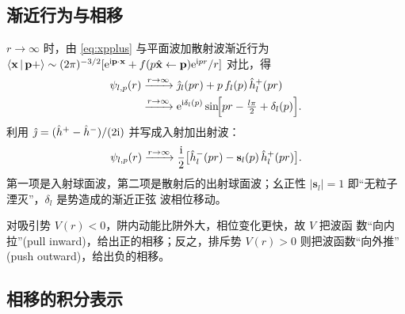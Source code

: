 \subsection{渐近行为与相移}

$r\to\infty$ 时，由 \eqref{eq:xpplus} 与平面波加散射波渐近行为
$\left\langle \mathbf x \,\middle|\, \mathbf p+ \right\rangle\sim
(2\pi)^{-3/2}[\mathrm{e}^{\mathrm{i}\mathbf p\cdot\mathbf x}+f(p\hat{\mathbf x}\leftarrow\mathbf p)\mathrm{e}^{\mathrm{i} pr}/r]$
对比，得
\begin{align}
\psi_{l,p}(r)
&\xrightarrow{r\to\infty} \hat\jmath_l(pr)
   + p\,f_l(p)\,\hat h_l^+(pr)\nonumber\\
&\xrightarrow{r\to\infty}
   \mathrm{e}^{\mathrm{i}\delta_l(p)}\sin\!\Bigl[pr-\tfrac{l\pi}{2}+\delta_l(p)\Bigr].
\label{eq:psi-asy}
\end{align}
利用 $\hat\jmath=(\hat h^+ -\hat h^-)/(2\mathrm{i})$ 并写成入射加出射波：
\begin{equation}\label{eq:psi-in-out}
\psi_{l,p}(r)\xrightarrow{r\to\infty}
\frac{\mathrm{i}}{2}\bigl[\hat h_l^-(pr)-\mathbf s_l(p)\,\hat h_l^+(pr)\bigr].
\end{equation}
第一项是入射球面波，第二项是散射后的出射球面波；幺正性
$|\mathbf s_l|=1$ 即“无粒子湮灭”，$\delta_l$ 是势造成的渐近正弦
波相位移动。

\begin{example}[方势阱与方势垒的物理图像]
对吸引势 $V(r)<0$，阱内动能比阱外大，相位变化更快，故 $V$ 把波函
数“向内拉”(pull inward)，给出正的相移；反之，排斥势 $V(r)>0$
则把波函数“向外推” (push outward)，给出负的相移。
\end{example}

\subsection{相移的积分表示}

